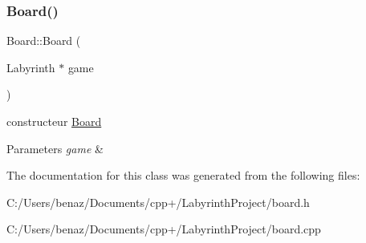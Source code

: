 \subsubsection{\texorpdfstring{Board()}{Board()}}
{\footnotesize\ttfamily Board\+::\+Board (\begin{DoxyParamCaption}\item[{Labyrinth $\ast$}]{game }\end{DoxyParamCaption})}



constructeur \mbox{\hyperlink{class_board}{Board}} 


\begin{DoxyParams}{Parameters}
{\em game} & \\
\hline
\end{DoxyParams}


The documentation for this class was generated from the following files\+:\begin{DoxyCompactItemize}
\item 
C\+:/\+Users/benaz/\+Documents/cpp+/\+Labyrinth\+Project/board.\+h\item 
C\+:/\+Users/benaz/\+Documents/cpp+/\+Labyrinth\+Project/board.\+cpp\end{DoxyCompactItemize}
